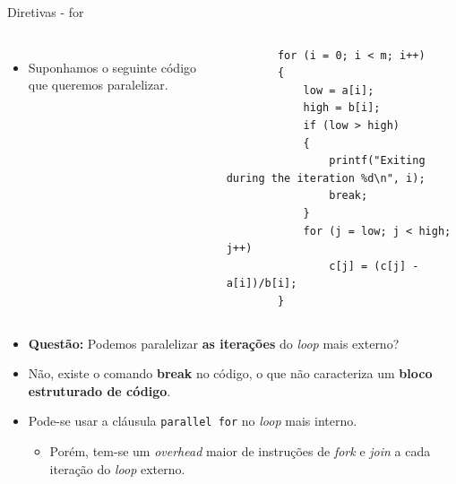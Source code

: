 \begin{frame}[fragile]{Diretivas - for}
	\begin{columns}
		\begin{itemize}
			\item Suponhamos o seguinte código que queremos paralelizar.
		\end{itemize}
		\begin{verbatim}
		for (i = 0; i < m; i++)
		{
			low = a[i];
			high = b[i];
			if (low > high)
			{
				printf("Exiting during the iteration %d\n", i);
				break;
			}
			for (j = low; j < high; j++)
				c[j] = (c[j] - a[i])/b[i];
		}
		\end{verbatim}
	\end{columns}
	\fontsize{8pt}{7.2}\selectfont
	\begin{itemize}
		\item \textbf{Questão:} Podemos paralelizar \textbf{as iterações} do \textit{loop} mais externo?
		\pause
		\medskip
		\item {\color{bostonuniversityred} Não, existe o comando \textbf{break} no código, o que não caracteriza um \textbf{bloco estruturado de código}.}
		\pause
		\item Pode-se usar a cláusula \texttt{parallel for} no \textit{loop} mais interno.
		\pause
		\medskip
		\begin{itemize}
			\item Porém, tem-se um \textit{overhead} maior de instruções de \textit{fork} e \textit{join} a cada iteração do \textit{loop} externo.
		\end{itemize}
	\end{itemize}
\end{frame}

